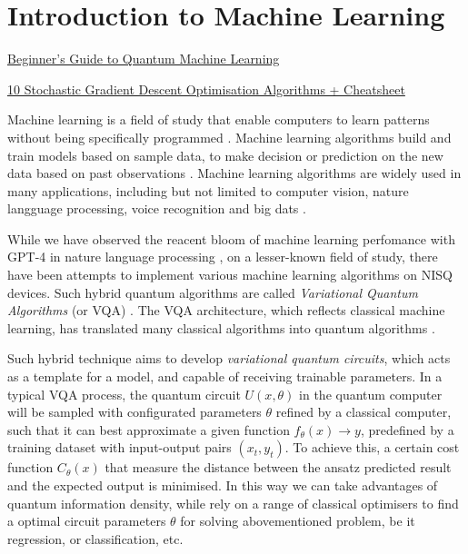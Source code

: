 \section{Introduction to Machine Learning} \label{Sec: Introduction to Machine Learning}

\begin{framed}

    \href{https://blog.paperspace.com/beginners-guide-to-quantum-machine-learning/}{Beginner's Guide to Quantum Machine Learning}

    \href{https://towardsdatascience.com/10-gradient-descent-optimisation-algorithms-86989510b5e9}{10 Stochastic Gradient Descent Optimisation Algorithms + Cheatsheet}

\end{framed}



Machine learning is a field of study that enable computers to learn patterns without being specifically programmed \cite{kaurIntroductionMachineLearning2021}.
Machine learning algorithms build and train models based on sample data, to make decision or prediction on the new data based on past observations \cite{kozaAutomatedDesignBoth1996}.
Machine learning algorithms are widely used in many applications, including but not limited to computer vision, nature langguage processing, voice recognition and big dats \cite{khanMachineLearningComputer2020, zhangNaturalLanguageProcessing2021,tandelVoiceRecognitionVoice2020,elbouchefryLearningBigData2020, shindeReviewMachineLearning2018}.

While we have observed the reacent bloom of machine learning perfomance with GPT-4 in nature language processing \cite{openaiGPT4TechnicalReport2023}, on a lesser-known field of study, there have been attempts to implement various machine learning algorithms on NISQ devices.
Such hybrid quantum algorithms are called \emph{Variational Quantum Algorithms} (or VQA) \cite{cerezoVariationalQuantumAlgorithms2021}.
The VQA architecture, which reflects classical machine learning, has translated many classical algorithms into quantum algorithms \cite{zoufalVariationalQuantumBoltzmann2021a, tillyVariationalQuantumEigensolver2021a}.

Such hybrid technique aims to develop \emph{variational quantum circuits}, which acts as a template for a model, and capable of receiving trainable parameters.
In a typical VQA process, the quantum circuit $U(x, \theta)$ in the quantum computer will be sampled with configurated parameters $\theta$ refined by a classical computer, such that it can best approximate a given function ${f_\theta(x) \rightarrow y}$, predefined by a training dataset with input-output pairs $(x_t, y_t)$.
To achieve this, a certain cost function ${C_\theta(x)}$ that measure the distance between the ansatz predicted result and the expected output is minimised.
In this way we can take advantages of quantum information density, while rely on a range of classical optimisers to find a optimal circuit parameters $\theta$ for solving abovementioned problem, be it regression, or classification, etc.

